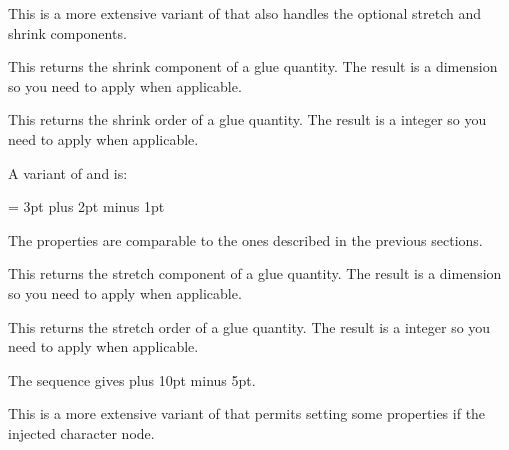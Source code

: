 \stopoldprimitive

\startoldprimitive[title={\prm {glueexpr}}]

This is a more extensive variant of  that also handles the optional
stretch and shrink components.

\stopoldprimitive

\startoldprimitive[title={\prm {glueshrink}}]

This returns the shrink component of a glue quantity. The result is a dimension
so you need to apply  when applicable.

\stopoldprimitive

\startoldprimitive[title={\prm {glueshrinkorder}}]

This returns the shrink order of a glue quantity. The result is a integer so you
need to apply  when applicable.

\stopoldprimitive

\startnewprimitive[title={\prm {gluespecdef}}]

A variant of  and  is:

\starttyping
\gluespecdef\MyGlue = 3pt plus 2pt minus 1pt
\stoptyping

The properties are comparable to the ones described in the previous sections.

\stopnewprimitive

\startoldprimitive[title={\prm {gluestretch}}]

This returns the stretch component of a glue quantity. The result is a dimension
so you need to apply  when applicable.

\stopoldprimitive

\startoldprimitive[title={\prm {gluestretchorder}}]

This returns the stretch order of a glue quantity. The result is a integer so you
need to apply  when applicable.

\stopoldprimitive

\startoldprimitive[title={\prm {gluetomu}}]

The sequence  gives \the \gluetomu
20pt plus 10pt minus 5pt.

\stopoldprimitive

\startnewprimitive[title={\prm {glyph}}]

This is a more extensive variant of  that permits setting some
properties if the injected character node.

